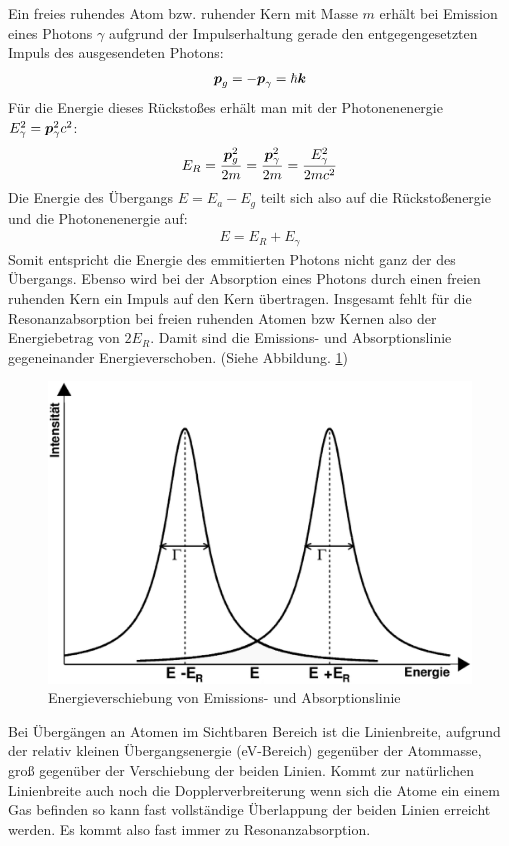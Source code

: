 \documentclass[12pt]{article}
\renewcommand*\vec[1]{{\mbox{\boldmath\ensuremath{#1}}}}
\begin{document}
Ein freies ruhendes Atom bzw. ruhender Kern mit Masse $m$ erhält bei Emission eines Photons $\gamma$ aufgrund der Impulserhaltung
gerade den entgegengesetzten Impuls des ausgesendeten Photons:
\begin{align}
 \vec{p}_g = -\vec{p}_\gamma = \hbar\vec{k}
\end{align}
Für die Energie dieses Rückstoßes erhält man mit der Photonenenergie $E^2_\gamma = \vec{p}^2_\gamma c^2$:
\begin{align}
 E_R = \frac{\vec{p}_g^2}{2m} = \frac{\vec{p}^2_\gamma}{2m} = \frac{E^2_\gamma}{2mc^2}
 \label{e_r}
\end{align}
Die Energie des Übergangs $E = E_a - E_g$ teilt sich also auf die Rückstoßenergie und die Photonenenergie auf:
\begin{align}
 E = E_R + E_\gamma
\end{align}
Somit entspricht die Energie des emmitierten Photons nicht ganz der des Übergangs. Ebenso wird bei der Absorption eines Photons durch einen freien ruhenden
Kern ein Impuls auf den Kern übertragen. Insgesamt fehlt für die Resonanzabsorption bei freien ruhenden Atomen bzw Kernen also der Energiebetrag von $2E_R$.
Damit sind die Emissions- und Absorptionslinie gegeneinander Energieverschoben. (Siehe Abbildung. \ref{energieverschiebung})
\begin{figure}
 \includegraphics[width=0.9\linewidth]{pictures/energieverschiebung.eps}
 \caption{Energieverschiebung von Emissions- und Absorptionslinie}
 \label{energieverschiebung}
\end{figure}
Bei Übergängen an Atomen im Sichtbaren Bereich ist die Linienbreite, aufgrund der relativ kleinen Übergangsenergie (eV-Bereich) gegenüber der Atommasse,
groß gegenüber der Verschiebung der beiden Linien. Kommt zur natürlichen Linienbreite auch noch die Dopplerverbreiterung wenn sich die Atome ein einem Gas
befinden so kann fast vollständige Überlappung der beiden Linien erreicht werden. Es kommt also fast immer zu Resonanzabsorption.
\end{document}
